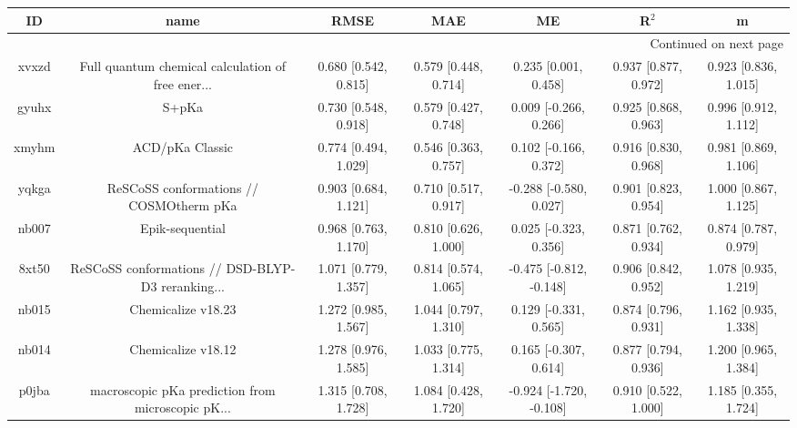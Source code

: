 \documentclass{article}
\begin{document}
\begin{center}
\begin{longtable}{|ccccccc|}
\toprule
    ID &                                               name &                  RMSE &                   MAE &                       ME &                 R$^2$ &                      m \\
\midrule
\endhead
\midrule
\multicolumn{7}{r}{{Continued on next page}} \\
\midrule
\endfoot

\bottomrule
\endlastfoot
 xvxzd &  Full quantum chemical calculation of free ener... &  0.680 [0.542, 0.815] &  0.579 [0.448, 0.714] &     0.235 [0.001, 0.458] &  0.937 [0.877, 0.972] &   0.923 [0.836, 1.015] \\
 gyuhx &                                              S+pKa &  0.730 [0.548, 0.918] &  0.579 [0.427, 0.748] &    0.009 [-0.266, 0.266] &  0.925 [0.868, 0.963] &   0.996 [0.912, 1.112] \\
 xmyhm &                                    ACD/pKa Classic &  0.774 [0.494, 1.029] &  0.546 [0.363, 0.757] &    0.102 [-0.166, 0.372] &  0.916 [0.830, 0.968] &   0.981 [0.869, 1.106] \\
 yqkga &            ReSCoSS conformations // COSMOtherm pKa &  0.903 [0.684, 1.121] &  0.710 [0.517, 0.917] &   -0.288 [-0.580, 0.027] &  0.901 [0.823, 0.954] &   1.000 [0.867, 1.125] \\
 nb007 &                                    Epik-sequential &  0.968 [0.763, 1.170] &  0.810 [0.626, 1.000] &    0.025 [-0.323, 0.356] &  0.871 [0.762, 0.934] &   0.874 [0.787, 0.979] \\
 8xt50 &  ReSCoSS conformations // DSD-BLYP-D3 reranking... &  1.071 [0.779, 1.357] &  0.814 [0.574, 1.065] &  -0.475 [-0.812, -0.148] &  0.906 [0.842, 0.952] &   1.078 [0.935, 1.219] \\
 nb015 &                                 Chemicalize v18.23 &  1.272 [0.985, 1.567] &  1.044 [0.797, 1.310] &    0.129 [-0.331, 0.565] &  0.874 [0.796, 0.931] &   1.162 [0.935, 1.338] \\
 nb014 &                                 Chemicalize v18.12 &  1.278 [0.976, 1.585] &  1.033 [0.775, 1.314] &    0.165 [-0.307, 0.614] &  0.877 [0.794, 0.936] &   1.200 [0.965, 1.384] \\
 p0jba &  macroscopic pKa prediction from microscopic pK... &  1.315 [0.708, 1.728] &  1.084 [0.428, 1.720] &  -0.924 [-1.720, -0.108] &  0.910 [0.522, 1.000] &   1.185 [0.355, 1.724] \\

\end{longtable}
\end{center}
\end{document}
